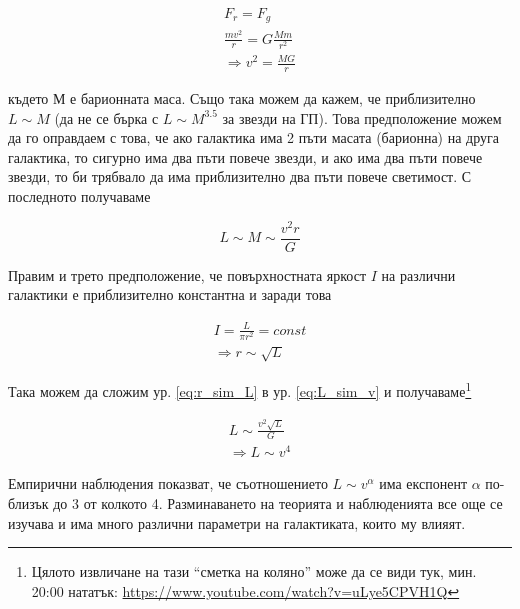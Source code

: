 \documentclass[a4paper,12pt]{article}
\begin{document}
\begin{gather}
    F_r = F_g\\
    \frac{mv^2}{r} = G \frac{Mm}{r^2}\\
    \Rightarrow v^2 = \frac{MG}{r}
\end{gather}

където $М$ е барионната маса. Също така можем да кажем, че приблизително $L \sim M$ (да не се бърка с $L \sim M^{3.5}$ за звезди на ГП). Това предположение можем да го оправдаем с това, че ако галактика има 2 пъти масата (барионна) на друга галактика, то сигурно има два пъти повече звезди, и ако има два пъти повече звезди, то би трябвало да има приблизително два пъти повече светимост. С последното получаваме

\begin{equation}
    \label{eq:L_sim_v}
    L \sim M \sim \frac{v^2 r}{G}
\end{equation}

Правим и трето предположение, че повърхностната яркост $I$ на различни галактики е приблизително константна и заради това

\begin{gather}
    I = \frac{L}{\pi r^2} = const\\
    \label{eq:r_sim_L}
    \Rightarrow r \sim \sqrt{L}
\end{gather}

Така можем да сложим ур. \eqref{eq:r_sim_L} в ур. \eqref{eq:L_sim_v} и получаваме\footnote{Цялото извличане на тази ``сметка на коляно'' може да се види тук, мин. 20:00 нататък: \url{https://www.youtube.com/watch?v=uLye5CPVH1Q}}

\begin{gather}
    L \sim \frac{v^2 \sqrt{L}}{G}\\
    \Rightarrow L \sim v^4
\end{gather}

Емпирични наблюдения показват, че съотношението $L \sim v^\alpha$ има експонент $\alpha$ по-близък до 3 от колкото 4. Разминаването на теорията и наблюденията все още се изучава и има много различни параметри на галактиката, които му влияят.
\end{document}
